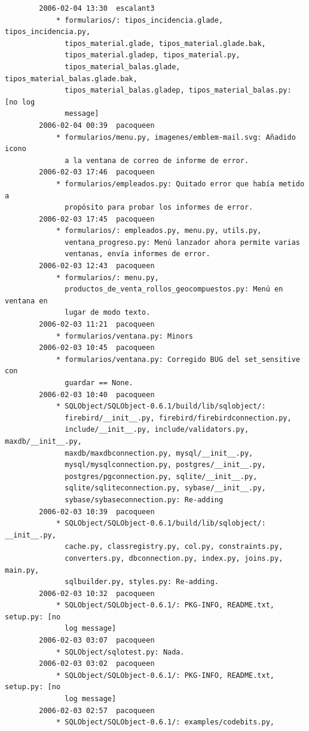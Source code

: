 \documentclass[a4paper]{article}
\begin{document}
\begin{verbatim}
        2006-02-04 13:30  escalant3
            * formularios/: tipos_incidencia.glade, tipos_incidencia.py,
              tipos_material.glade, tipos_material.glade.bak,
              tipos_material.gladep, tipos_material.py,
              tipos_material_balas.glade, tipos_material_balas.glade.bak,
              tipos_material_balas.gladep, tipos_material_balas.py: [no log
              message]
        2006-02-04 00:39  pacoqueen
            * formularios/menu.py, imagenes/emblem-mail.svg: Añadido icono
              a la ventana de correo de informe de error.
        2006-02-03 17:46  pacoqueen
            * formularios/empleados.py: Quitado error que había metido a
              propósito para probar los informes de error.
        2006-02-03 17:45  pacoqueen
            * formularios/: empleados.py, menu.py, utils.py,
              ventana_progreso.py: Menú lanzador ahora permite varias
              ventanas, envía informes de error.
        2006-02-03 12:43  pacoqueen
            * formularios/: menu.py,
              productos_de_venta_rollos_geocompuestos.py: Menú en ventana en
              lugar de modo texto.
        2006-02-03 11:21  pacoqueen
            * formularios/ventana.py: Minors
        2006-02-03 10:45  pacoqueen
            * formularios/ventana.py: Corregido BUG del set_sensitive con
              guardar == None.
        2006-02-03 10:40  pacoqueen
            * SQLObject/SQLObject-0.6.1/build/lib/sqlobject/:
              firebird/__init__.py, firebird/firebirdconnection.py,
              include/__init__.py, include/validators.py, maxdb/__init__.py,
              maxdb/maxdbconnection.py, mysql/__init__.py,
              mysql/mysqlconnection.py, postgres/__init__.py,
              postgres/pgconnection.py, sqlite/__init__.py,
              sqlite/sqliteconnection.py, sybase/__init__.py,
              sybase/sybaseconnection.py: Re-adding
        2006-02-03 10:39  pacoqueen
            * SQLObject/SQLObject-0.6.1/build/lib/sqlobject/: __init__.py,
              cache.py, classregistry.py, col.py, constraints.py,
              converters.py, dbconnection.py, index.py, joins.py, main.py,
              sqlbuilder.py, styles.py: Re-adding.
        2006-02-03 10:32  pacoqueen
            * SQLObject/SQLObject-0.6.1/: PKG-INFO, README.txt, setup.py: [no
              log message]
        2006-02-03 03:07  pacoqueen
            * SQLObject/sqlotest.py: Nada.
        2006-02-03 03:02  pacoqueen
            * SQLObject/SQLObject-0.6.1/: PKG-INFO, README.txt, setup.py: [no
              log message]
        2006-02-03 02:57  pacoqueen
            * SQLObject/SQLObject-0.6.1/: examples/codebits.py,

\end{verbatim}
\end{document}
